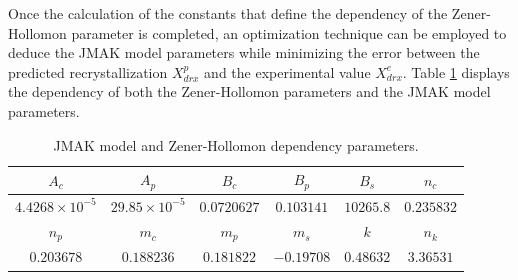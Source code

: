 \documentclass[metals,article,submit,pdftex,moreauthors]{Definitions/mdpi}
\begin{document}
Once the calculation of the constants that define the dependency of the Zener-Hollomon parameter is completed, an optimization technique can be employed to deduce the JMAK model parameters while minimizing the error between the predicted recrystallization $X_{drx}^{p}$ and the experimental value $X_{drx}^{e}$.
Table \ref{tab:allparams} displays the dependency of both the Zener-Hollomon parameters and the JMAK model parameters.

\begin{table}[h]
\centering
\caption{JMAK model and Zener-Hollomon dependency parameters.}\vspace{-1mm}
\begin{tabular}{cccccc}
\toprule
$A_c$ & $A_p$& $B_c$& $B_p$& $B_s$& $n_c$ \\
\hline
$4.4268\times10^{-5}$& $29.85\times10^{-5}$& $0.0720627$&$0.103141$&$10265.8$&$0.235832$\\
\toprule
$n_p$ & $m_c$& $m_p$& $m_s$& $k$& $n_k$ \\
\hline
$0.203678	$& $0.188236$&$0.181822$&$-0.19708$&$0.48632$&$3.36531$\\
\bottomrule
\end{tabular}
\label{tab:allparams}
\end{table}
\end{document}
